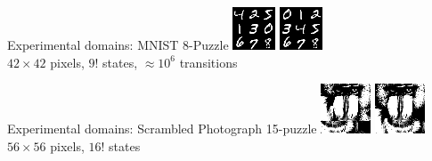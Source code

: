 \documentclass{lecture}
\begin{document}
\begin{frame}{Experimental domains: MNIST 8-Puzzle}
    \includegraphics[width=.45\textwidth]{img___static___vanilla___mnist___init.png}
    \hfill
    \includegraphics[width=.45\textwidth]{img___static___vanilla___mnist___goal.png}\\
    \vfill
    $42\times 42$ pixels, $9!$ states, $\approx 10^6$ transitions
    \vfill
\end{frame}

\begin{frame}{Experimental domains: Scrambled Photograph 15-puzzle}
    \includegraphics[width=.45\textwidth]{img___static___vanilla___mandrill___init.png}
    \hfill
    \includegraphics[width=.45\textwidth]{img___static___vanilla___mandrill___goal.png}\\
    \vfill
    $56\times 56$ pixels, $16!$ states
    \vfill
\end{frame}
\end{document}
